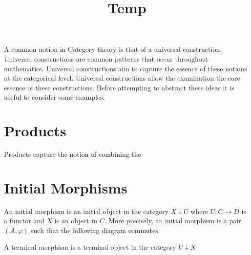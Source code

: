 \documentclass[a4paper,10pt]{article}
\title{Temp}
\begin{document}
\maketitle
A common notion in Category theory is that of a universal construction. Universal constructions are common patterns that occur throughout mathematics. Universal constructions aim to capture the essence of these notions at the categorical level. Universal constructions allow the examination the core essence of these constructions. Before attempting to abstract these ideas it is useful to consider some examples.
\section{Products}
Products capture the notion of combining the


\section{Initial Morphisms}
An initial morphism is an initial object in the category $X \downarrow U$ where $U : C \rightarrow D$ is a functor and $X$ is an object in $C$. More precisely, an initial morphism is a pair $(A, \varphi)$ such that the following diagram commutes.

A terminal morphism is a terminal object in the category $U \downarrow X$
\end{document}
